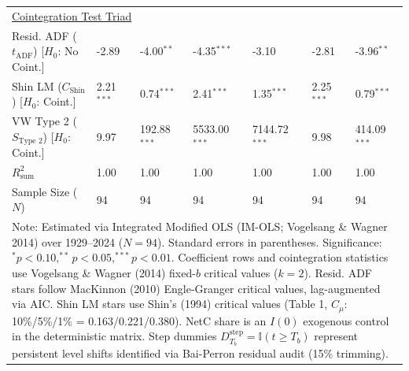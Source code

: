 \begin{table}[H]
\begin{tabular}{p{3.8cm}p{2.1cm}p{2.1cm}p{2.1cm}p{2.1cm}p{2.1cm}p{2.1cm}}
\midrule
\multicolumn{7}{l}{\underline{Cointegration Test Triad}} \\
\makecell[l]{Resid. ADF ($t_{\text{ADF}}$) \\ {\scriptsize [$H_0$: No Coint.]}} & -2.89 & -4.00$^{**}$ & -4.35$^{***}$ & -3.10 & -2.81 & -3.96$^{**}$  \\
\makecell[l]{Shin LM ($C_{\text{Shin}}$) \\ {\scriptsize [$H_0$: Coint.]}} & 2.21$^{***}$ & 0.74$^{***}$ & 2.41$^{***}$ & 1.35$^{***}$ & 2.25$^{***}$ & 0.79$^{***}$  \\
\makecell[l]{VW Type 2 ($S_{\text{Type 2}}$) \\ {\scriptsize [$H_0$: Coint.]}} & 9.97 & 192.88$^{***}$ & 5533.00$^{***}$ & 7144.72$^{***}$ & 9.98 & 414.09$^{***}$  \\
\midrule
$R^2_{\text{sum}}$ & 1.00 & 1.00 & 1.00 & 1.00 & 1.00 & 1.00  \\
Sample Size ($N$) & 94 & 94 & 94 & 94 & 94 & 94  \\
\bottomrule
\multicolumn{7}{p{16.5cm}}{\footnotesize Note: Estimated via Integrated Modified OLS (IM-OLS; Vogelsang \& Wagner 2014) over 1929--2024 ($N=94$). Standard errors in parentheses. Significance: $^*p<0.10, ^{**}p<0.05, ^{***}p<0.01$. Coefficient rows and cointegration statistics use Vogelsang \& Wagner (2014) fixed-$b$ critical values ($k=2$). Resid. ADF stars follow MacKinnon (2010) Engle-Granger critical values, lag-augmented via AIC. Shin LM stars use Shin's (1994) critical values (Table 1, $C_\mu$: 10\%/5\%/1\% = 0.163/0.221/0.380). NetC share is an $I(0)$ exogenous control in the deterministic matrix. Step dummies $D^{\text{step}}_{T_b} = \mathbb{I}(t \ge T_b)$ represent persistent level shifts identified via Bai-Perron residual audit (15\% trimming).}
\end{tabular}
\end{table}
